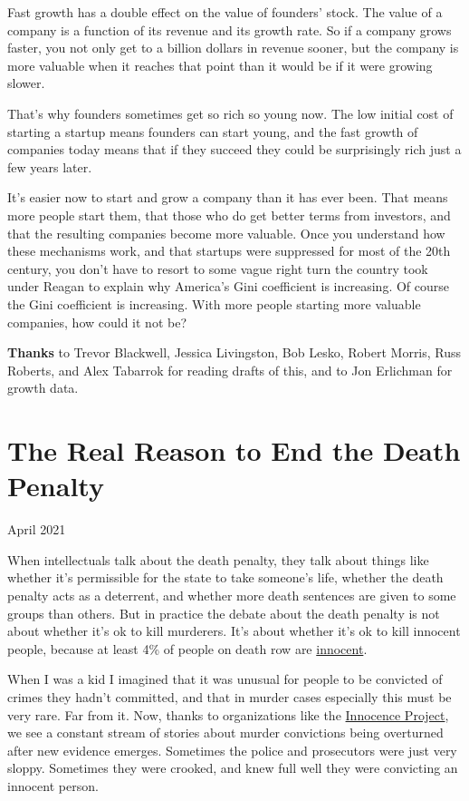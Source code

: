 \documentclass[12pt]{book}
\begin{document}
Fast growth has a double effect on the value of founders' stock. The
value of a company is a function of its revenue and its growth rate. So
if a company grows faster, you not only get to a billion dollars in
revenue sooner, but the company is more valuable when it reaches that
point than it would be if it were growing slower.

That's why founders sometimes get so rich so young now. The low initial
cost of starting a startup means founders can start young, and the fast
growth of companies today means that if they succeed they could be
surprisingly rich just a few years later.

It's easier now to start and grow a company than it has ever been. That
means more people start them, that those who do get better terms from
investors, and that the resulting companies become more valuable. Once
you understand how these mechanisms work, and that startups were
suppressed for most of the 20th century, you don't have to resort to
some vague right turn the country took under Reagan to explain why
America's Gini coefficient is increasing. Of course the Gini coefficient
is increasing. With more people starting more valuable companies, how
could it not be?


\textbf{Thanks} to Trevor Blackwell, Jessica Livingston, Bob Lesko,
Robert Morris, Russ Roberts, and Alex Tabarrok for reading drafts of
this, and to Jon Erlichman for growth data.
\chapter{The Real Reason to End the Death Penalty}

April 2021

When intellectuals talk about the death penalty, they talk about things
like whether it's permissible for the state to take someone's life,
whether the death penalty acts as a deterrent, and whether more death
sentences are given to some groups than others. But in practice the
debate about the death penalty is not about whether it's ok to kill
murderers. It's about whether it's ok to kill innocent people, because
at least 4\% of people on death row are
\href{https://www.pnas.org/content/111/20/7230}{innocent}.

When I was a kid I imagined that it was unusual for people to be
convicted of crimes they hadn't committed, and that in murder cases
especially this must be very rare. Far from it. Now, thanks to
organizations like the
\href{https://innocenceproject.org/all-cases}{Innocence Project}, we see
a constant stream of stories about murder convictions being overturned
after new evidence emerges. Sometimes the police and prosecutors were
just very sloppy. Sometimes they were crooked, and knew full well they
were convicting an innocent person.
\end{document}
